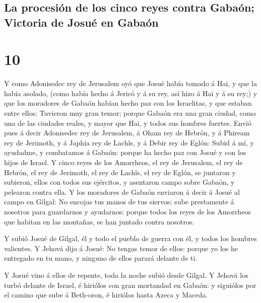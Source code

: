 \hypertarget{la-procesiuxf3n-de-los-cinco-reyes-contra-gabauxf3n-victoria-de-josuuxe9-en-gabauxf3n}{%
\subsection{La procesión de los cinco reyes contra Gabaón; Victoria de
Josué en
Gabaón}\label{la-procesiuxf3n-de-los-cinco-reyes-contra-gabauxf3n-victoria-de-josuuxe9-en-gabauxf3n}}

\hypertarget{section-06-10}{%
\section{10}\label{section-06-10}}

 Y como Adonisedec rey de Jerusalem oyó que Josué había
tomado á Hai, y que la había asolado, (como había hecho á Jericó y á su
rey, así hizo á Hai y á su rey;) y que los moradores de Gabaón habían
hecho paz con los Israelitas, y que estaban entre ellos; 
Tuvieron muy gran temor; porque Gabaón era una gran ciudad, como una de
las ciudades reales, y mayor que Hai, y todos sus hombres fuertes.
 Envió pues á decir Adonisedec rey de Jerusalem, á Oham
rey de Hebrón, y á Phiream rey de Jerimoth, y á Japhia rey de Lachîs, y
á Debir rey de Eglón:  Subid á mí, y ayudadme, y
combatamos á Gabaón: porque ha hecho paz con Josué y con los hijos de
Israel.  Y cinco reyes de los Amorrheos, el rey de
Jerusalem, el rey de Hebrón, el rey de Jerimoth, el rey de Lachîs, el
rey de Eglón, se juntaron y subieron, ellos con todos sus ejércitos, y
asentaron campo sobre Gabaón, y pelearon contra ella.  Y
los moradores de Gabaón enviaron á decir á Josué al campo en Gilgal: No
encojas tus manos de tus siervos; sube prestamente á nosotros para
guardarnos y ayudarnos: porque todos los reyes de los Amorrheos que
habitan en las montañas, se han juntado contra nosotros.

 Y subió Josué de Gilgal, él y todo el pueblo de guerra
con él, y todos los hombres valientes.  Y Jehová dijo á
Josué: No tengas temor de ellos: porque yo los he entregado en tu mano,
y ninguno de ellos parará delante de ti.

 Y Josué vino á ellos de repente, toda la noche subió
desde Gilgal.  Y Jehová los turbó delante de Israel, é
hiriólos con gran mortandad en Gabaón: y siguiólos por el camino que
sube á Beth-oron, é hiriólos hasta Azeca y Maceda.

